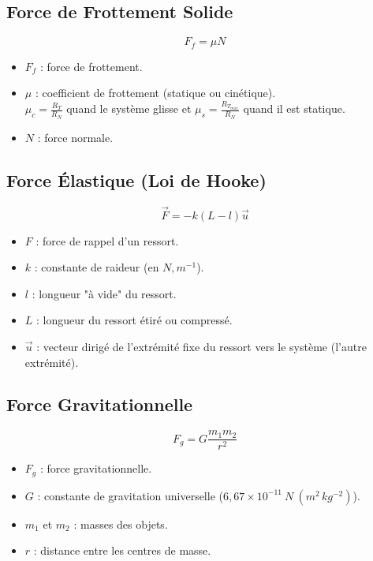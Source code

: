 \documentclass[a4paper,12pt]{article}
\renewcommand{\vec}{\overrightarrow}  %
\begin{document}
\begin{multicols}{2}
        \subsection{Force de Frottement Solide}
                $$ F_f = \mu N $$
            \begin{itemize}[label=$\bullet$]
                \item $F_f$ : force de frottement.
                \item $\mu$ : coefficient de frottement (statique ou cinétique).\\
                $\mu_c=\frac{R_T}{R_N}$ quand le système glisse et $\mu_s=\frac{R_{T_{max}}}{R_N}$ quand il est statique.
                \item $N$ : force normale.
            \end{itemize}
            
        \subsection{Force Élastique (Loi de Hooke)}
                $$ \vec{F} = -k (L- l) \vec{u} $$
            \begin{itemize}[label=$\bullet$]
                \item $F$ : force de rappel d'un ressort.
                \item $k$ : constante de raideur (en $N , m^{-1}$).
                \item $l$ : longueur "à vide" du ressort.
                \item $L$ : longueur du ressort étiré ou compressé.
                \item $\vec{u}$ : vecteur dirigé de l'extrémité fixe du ressort vers le système (l'autre extrémité).
            \end{itemize}
            
        \subsection{Force Gravitationnelle}
                $$ F_g = G \frac{m_1 m_2}{r^2} $$
            \begin{itemize}[label=$\bullet$]
                \item $F_g$ : force gravitationnelle.
                \item $G$ : constante de gravitation universelle ($6,67 \times 10^{-11} \ N \ (m^2 \, kg^{-2})$).
                \item $m_1$ et $m_2$ : masses des objets.
                \item $r$ : distance entre les centres de masse.
            \end{itemize}


\end{multicols}
\end{document}
